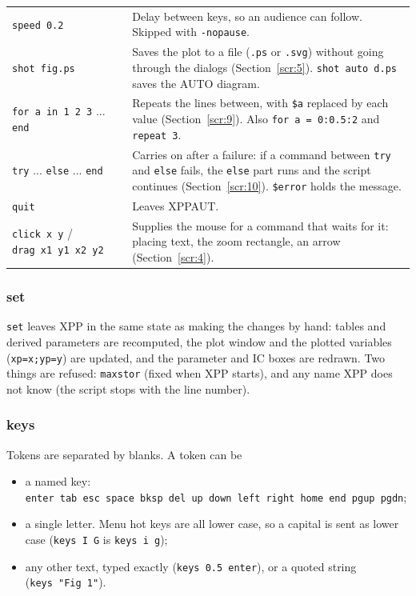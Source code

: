 \documentclass{article}
\providecommand{\tightlist}{\setlength{\itemsep}{0pt}\setlength{\parskip}{0pt}}
\begin{document}
\begin{longtable}[]{@{}p{}p{}@{}}
\texttt{speed\ 0.2} & Delay between keys, so an audience can follow. Skipped with
\texttt{-nopause}. \\
\texttt{shot\ fig.ps} & Saves the plot to a file (\texttt{.ps} or \texttt{.svg})
without going through the dialogs (Section~\ref{scr:5}).
\texttt{shot\ auto\ d.ps} saves the AUTO diagram. \\
\texttt{for\ a\ in\ 1\ 2\ 3} ... \texttt{end} & Repeats the lines between, with \texttt{\$a} replaced by each
value (Section~\ref{scr:9}). Also \texttt{for\ a\ =\ 0:0.5:2} and
\texttt{repeat\ 3}. \\
\texttt{try} ... \texttt{else} ... \texttt{end} & Carries on after a failure: if a command between \texttt{try}
and \texttt{else} fails, the \texttt{else} part runs and the
script continues (Section~\ref{scr:10}). \texttt{\$error} holds the
message. \\
\texttt{quit} & Leaves XPPAUT. \\
\texttt{click\ x\ y} / \texttt{drag\ x1\ y1\ x2\ y2} & Supplies the mouse for a command that waits for it: placing text, the
zoom rectangle, an arrow (Section~\ref{scr:4}). \\
\end{longtable}

\subsubsection{set}

\texttt{set} leaves XPP in the same state as making the changes
by hand: tables and derived parameters are recomputed, the plot window
and the plotted variables (\texttt{xp=x;yp=y}) are updated, and the
parameter and IC boxes are redrawn. Two things are refused:
\texttt{maxstor} (fixed when XPP starts), and any name XPP does not
know (the script stops with the line number).

\subsubsection{keys}

Tokens are separated by blanks. A token can be

\begin{itemize}
\tightlist
\item
  a named key:
  \texttt{enter\ tab\ esc\ space\ bksp\ del\ up\ down\ left\ right\ home\ end\ pgup\ pgdn};
\item
  a single letter. Menu hot keys are all lower case, so a capital is
  sent as lower case (\texttt{keys\ I\ G} is
  \texttt{keys\ i\ g});
\item
  any other text, typed exactly (\texttt{keys\ 0.5\ enter}), or a
  quoted string (\texttt{keys\ "Fig\ 1"}).
\end{itemize}
\end{document}
